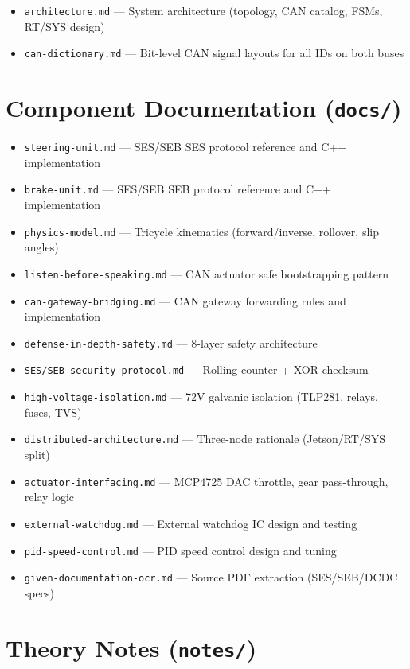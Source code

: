 \documentclass[12pt,a4paper,oneside]{report}
\begin{document}
\begin{itemize}[leftmargin=*,nosep]
  \item \texttt{architecture.md} --- System architecture (topology, CAN catalog, FSMs, RT/SYS design)
  \item \texttt{can-dictionary.md} --- Bit-level CAN signal layouts for all IDs on both buses
\end{itemize}

\section{Component Documentation (\texttt{docs/})}

\begin{itemize}[leftmargin=*,nosep]
  \item \texttt{steering-unit.md} --- SES/SEB SES protocol reference and C++ implementation
  \item \texttt{brake-unit.md} --- SES/SEB SEB protocol reference and C++ implementation
  \item \texttt{physics-model.md} --- Tricycle kinematics (forward/inverse, rollover, slip angles)
  \item \texttt{listen-before-speaking.md} --- CAN actuator safe bootstrapping pattern
  \item \texttt{can-gateway-bridging.md} --- CAN gateway forwarding rules and implementation
  \item \texttt{defense-in-depth-safety.md} --- 8-layer safety architecture
  \item \texttt{SES/SEB-security-protocol.md} --- Rolling counter + XOR checksum
  \item \texttt{high-voltage-isolation.md} --- 72V galvanic isolation (TLP281, relays, fuses, TVS)
  \item \texttt{distributed-architecture.md} --- Three-node rationale (Jetson/RT/SYS split)
  \item \texttt{actuator-interfacing.md} --- MCP4725 DAC throttle, gear pass-through, relay logic
  \item \texttt{external-watchdog.md} --- External watchdog IC design and testing
  \item \texttt{pid-speed-control.md} --- PID speed control design and tuning
  \item \texttt{given-documentation-ocr.md} --- Source PDF extraction (SES/SEB/DCDC specs)
\end{itemize}

\section{Theory Notes (\texttt{notes/})}
\end{document}
